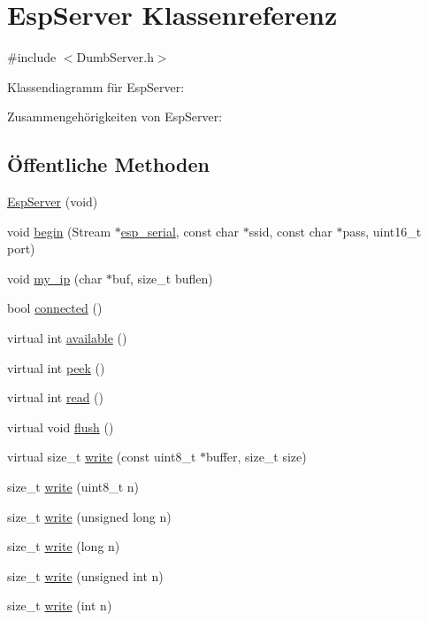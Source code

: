 \hypertarget{class_esp_server}{}\section{Esp\+Server Klassenreferenz}
\label{class_esp_server}


{\ttfamily \#include $<$Dumb\+Server.\+h$>$}



Klassendiagramm für Esp\+Server\+:


Zusammengehörigkeiten von Esp\+Server\+:
\subsection*{Öffentliche Methoden}
\begin{DoxyCompactItemize}
\item 
\hyperlink{class_esp_server_afcdc76f5ca68d5049657e5d9d971a1c3}{Esp\+Server} (void)
\item 
void \hyperlink{class_esp_server_a1d032e732d4733905d676ef016fcd43c}{begin} (Stream $\ast$\hyperlink{_arduino__kommentiert_8ino_af690b3a6882292855c4091ede8039998}{esp\+\_\+serial}, const char $\ast$ssid, const char $\ast$pass, uint16\+\_\+t port)
\item 
void \hyperlink{class_esp_server_a55995fd6398892be5768da85dde4f533}{my\+\_\+ip} (char $\ast$buf, size\+\_\+t buflen)
\item 
bool \hyperlink{class_esp_server_a6a25e008ded89de0e4599df7170008fb}{connected} ()
\item 
virtual int \hyperlink{class_esp_server_aad68b4972f6b8426004feeef6e98d02d}{available} ()
\item 
virtual int \hyperlink{class_esp_server_a005a9cd487f4ccb4ccef72197bf263b7}{peek} ()
\item 
virtual int \hyperlink{class_esp_server_ae47512714818b3b9a1d29d2bf1f70fdf}{read} ()
\item 
virtual void \hyperlink{class_esp_server_a05062a3ac7c70a79e991b66789384bf1}{flush} ()
\item 
virtual size\+\_\+t \hyperlink{class_esp_server_a0756c42343195dd1d1aa2f61c9b095bf}{write} (const uint8\+\_\+t $\ast$buffer, size\+\_\+t size)
\item 
size\+\_\+t \hyperlink{class_esp_server_aecc7262ee265fd78affe24f35e49e1bb}{write} (uint8\+\_\+t n)
\item 
size\+\_\+t \hyperlink{class_esp_server_ae3ba71ceb4df9357d8e258efe3e79f4d}{write} (unsigned long n)
\item 
size\+\_\+t \hyperlink{class_esp_server_ac256a11ccc8d32664729a7f5bfc71add}{write} (long n)
\item 
size\+\_\+t \hyperlink{class_esp_server_afde7c57b12659422147d9a5e56b76148}{write} (unsigned int n)
\item 
size\+\_\+t \hyperlink{class_esp_server_a2a49890c886a2b0569b11e02f986f867}{write} (int n)
\end{DoxyCompactItemize}
